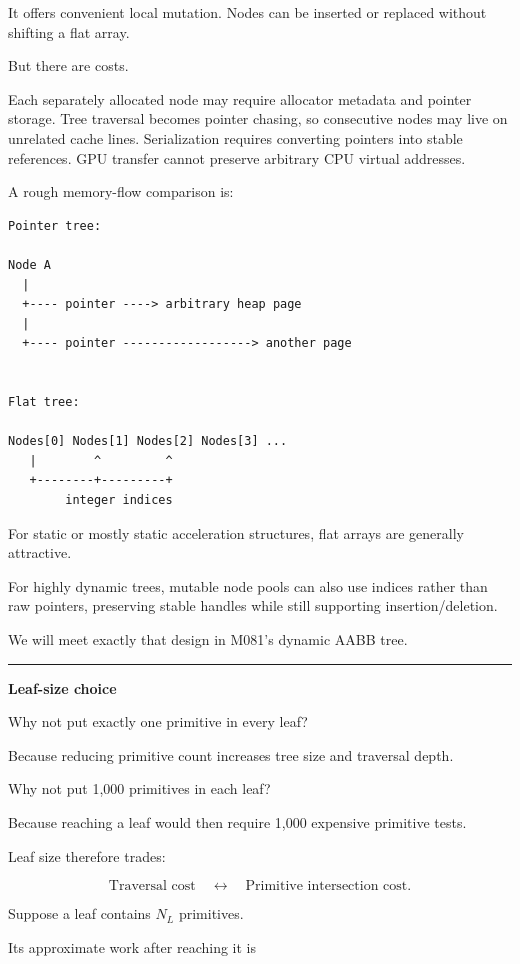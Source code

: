It offers convenient local mutation. Nodes can be inserted or replaced without shifting a flat array.

But there are costs.

Each separately allocated node may require allocator metadata and pointer storage. Tree traversal becomes pointer chasing, so consecutive nodes may live on unrelated cache lines. Serialization requires converting pointers into stable references. GPU transfer cannot preserve arbitrary CPU virtual addresses.

A rough memory-flow comparison is:

\begin{verbatim}
Pointer tree:

Node A
  |
  +---- pointer ----> arbitrary heap page
  |
  +---- pointer ------------------> another page


Flat tree:

Nodes[0] Nodes[1] Nodes[2] Nodes[3] ...
   |        ^         ^
   +--------+---------+
        integer indices
\end{verbatim}

For static or mostly static acceleration structures, flat arrays are generally attractive.

For highly dynamic trees, mutable node pools can also use indices rather than raw pointers, preserving stable handles while still supporting insertion/deletion.

We will meet exactly that design in M081's dynamic AABB tree.

\begin{center}\rule{0.5\linewidth}{0.5pt}\end{center}

\textbf{Leaf-size choice}

Why not put exactly one primitive in every leaf?

Because reducing primitive count increases tree size and traversal depth.

Why not put 1,000 primitives in each leaf?

Because reaching a leaf would then require 1,000 expensive primitive tests.

Leaf size therefore trades:

\[
\text{Traversal cost}
\quad\leftrightarrow\quad
\text{Primitive intersection cost}.
\]

Suppose a leaf contains \(N_L\) primitives.

Its approximate work after reaching it is

